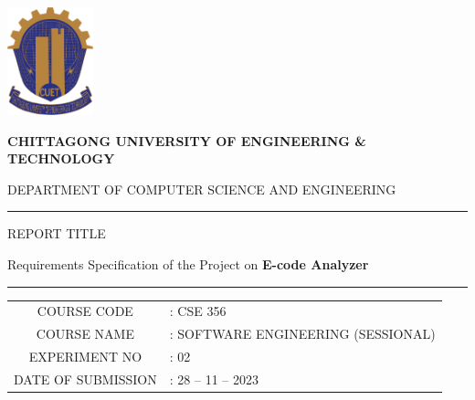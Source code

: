 \documentclass[a4paper,12pt]{report}
\begin{document}
\begin{titlepage}
	\begin{minipage}[t][3cm][b]{.2\linewidth}
		\includegraphics[width=2.5cm, keepaspectratio]{cuet.png} \par \vspace{0.5cm}
	\end{minipage}
	\begin{minipage}[t][4cm][t]{.75\linewidth}
		\raggedleft
		\vspace{0.1cm}
		{\bfseries \Large CHITTAGONG UNIVERSITY OF ENGINEERING \& TECHNOLOGY}
		\par
		\vspace{.5cm}
		{DEPARTMENT OF COMPUTER SCIENCE AND ENGINEERING}
	\end{minipage}

	\centering

	\vspace{1cm}

	\raisebox{-\baselineskip}{\rule{\textwidth}{1px}}

	\rule{\textwidth}{1px}

	\vspace{0.2cm}
	{\large{{REPORT TITLE}}}\par \vspace{0.3cm}
	\Large{{Requirements Specification of the Project on \bfseries{E-code Analyzer}}}
	\rule{\textwidth}{2px}

	\vspace{0.5cm}

	\normalsize
	\begin{tabular}{cl}
		COURSE CODE        & : CSE 356                          \\
		COURSE NAME        & : SOFTWARE ENGINEERING (SESSIONAL) \\
		EXPERIMENT NO      & : 02                               \\
		DATE OF SUBMISSION & : 28 -- 11 -- 2023                 \\
	\end{tabular}


\end{titlepage}
\end{document}
